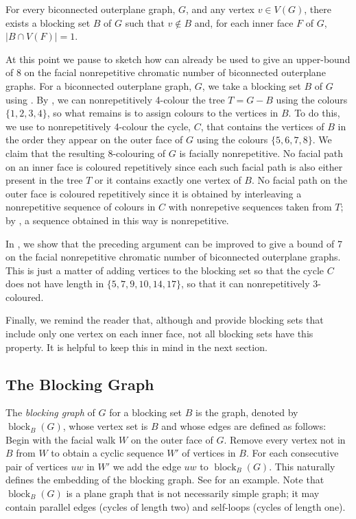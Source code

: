 \documentclass{patmorin}
\DeclareMathOperator{\block}{block}
\begin{document}
\begin{cor}
  For every biconnected outerplane graph, $G$, and any vertex $v\in
  V(G)$, there exists a blocking set $B$ of $G$ such that $v\not\in B$ and,
  for each inner face $F$ of $G$, $|B\cap V(F)|=1$.
\end{cor}

At this point we pause to sketch how 
can already be used to give an upper-bound of 8 on the facial
nonrepetitive chromatic number of biconnected outerplane graphs.  For a
biconnected outerplane graph, $G$, we take a blocking set $B$ of $G$
using .  By , we can nonrepetitively
4-colour the tree $T=G-B$ using the colours $\{1,2,3,4\}$, so
what remains is to assign colours to the vertices in $B$.  To do this,
we use  to nonrepetitively 4-colour the cycle, $C$, that
contains the vertices of $B$ in the order they appear on the outer face
of $G$ using the colours $\{5,6,7,8\}$.  We claim that the resulting
8-colouring of $G$ is facially nonrepetitive.  No facial path on an
inner face is coloured repetitively since each such facial path is also
either present in the tree $T$ or it contains exactly one vertex of $B$.
No facial path on the outer face is coloured repetitively since it is
obtained by interleaving a nonrepetitive sequence of colours in $C$
with nonrepetive sequences taken from $T$; by ,
a sequence obtained in this way is nonrepetitive.

In , we show that the preceding argument can be
improved to give a bound of 7 on the facial nonrepetitive chromatic
number of biconnected outerplane graphs. This is just a matter of adding
vertices to the blocking set so that the cycle $C$ does not have length
in $\{5,7,9,10,14,17\}$, so that it can nonrepetitively 3-coloured.

Finally, we remind the reader that, although  and
 provide blocking sets that include only one
vertex on each inner face, not all blocking sets have this property.
It is helpful to keep this in mind in the next section.

\subsection{The Blocking Graph}


The \emph{blocking graph} of $G$ for a blocking set $B$ is the graph,
denoted by $\block_B(G)$, whose vertex set is $B$ and whose edges are
defined as follows: Begin with the facial walk $W$ on the outer face
of $G$. Remove every vertex not in $B$ from $W$ to obtain a cyclic
sequence $W'$ of vertices in $B$. For each consecutive pair of vertices
$uw$ in $W'$ we add the edge $uw$ to $\block_B(G)$.  This naturally
defines the embedding of the blocking graph. See 
for an example.   Note that $\block_B(G)$ is a plane graph that is not
necessarily simple graph; it may contain parallel edges (cycles of length
two) and self-loops (cycles of length one).
\end{document}
